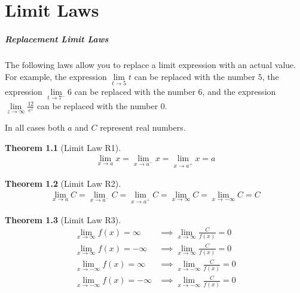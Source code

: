 \documentclass[10pt,oneside,]{book}
\theoremstyle{plain}
\theoremstyle{definition}
\numberwithin{equation}{section}
\newtheorem*{theorem*}{Theorem}
\newcommand{\fe}[2]{#1\mathopen{}\left(#2\right)\mathclose{}}
\begin{document}
\chapter[Limit Laws]{Limit Laws}\label{appendix-limit-laws}
\typeout{************************************************}
\typeout{************************************************}
\paragraph[Replacement Limit Laws]{Replacement Limit Laws}\label{paragraphs-74}
The following laws allow you to replace a limit expression with an actual value.  For example, the expression \(\lim\limits_{t\to5}t\) can be replaced with the number \(5\), the expression \(\lim\limits_{t\to7^{-}}6\) can be replaced with the number \(6\), and the expression \(\lim\limits_{z\to\infty}\frac{12}{e^z}\) can be replaced with the number \(0\).%
\par
In all cases both \(a\) and \(C\) represent real numbers.%
\begin{theorem*}[Limit Law R1]\label{llr1}
\begin{gather*}
\lim_{x\to a}x=\lim_{x\to a^{-}}x=\lim_{x\to a^{+}}x=a
\end{gather*}%
\end{theorem*}
\begin{theorem*}[Limit Law R2]\label{llr2}
\begin{gather*}
\lim_{x\to a}C=\lim_{x\to a^{-}}C=\lim_{x\to a^{+}}C=\lim_{x\to \infty}C=\lim_{x\to -\infty}C=C
\end{gather*}%
\end{theorem*}
\begin{theorem*}[Limit Law R3]\label{llr3}
\begin{align*}
\lim_{x\to \infty}\fe{f}{x}=\infty&\implies\lim_{x\to \infty}\frac{C}{\fe{f}{x}}=0\\
\lim_{x\to \infty}\fe{f}{x}=-\infty&\implies\lim_{x\to \infty}\frac{C}{\fe{f}{x}}=0\\
\lim_{x\to -\infty}\fe{f}{x}=\infty&\implies\lim_{x\to -\infty}\frac{C}{\fe{f}{x}}=0\\
\lim_{x\to -\infty}\fe{f}{x}=-\infty&\implies\lim_{x\to -\infty}\frac{C}{\fe{f}{x}}=0
\end{align*}%
\end{theorem*}
\typeout{************************************************}
\typeout{************************************************}
\end{document}
